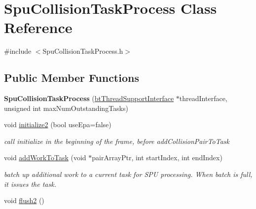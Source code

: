 \hypertarget{class_spu_collision_task_process}{\section{Spu\+Collision\+Task\+Process Class Reference}
\label{class_spu_collision_task_process}
}


{\ttfamily \#include $<$Spu\+Collision\+Task\+Process.\+h$>$}

\subsection*{Public Member Functions}
\begin{DoxyCompactItemize}
\item 
\hypertarget{class_spu_collision_task_process_ae2fd53d16de149643d8f538e183e48eb}{{\bfseries Spu\+Collision\+Task\+Process} (\hyperlink{classbt_thread_support_interface}{bt\+Thread\+Support\+Interface} $\ast$thread\+Interface, unsigned int max\+Num\+Outstanding\+Tasks)}\label{class_spu_collision_task_process_ae2fd53d16de149643d8f538e183e48eb}

\item 
\hypertarget{class_spu_collision_task_process_afcdb413769d35c957ddc5c8ec2985588}{void \hyperlink{class_spu_collision_task_process_afcdb413769d35c957ddc5c8ec2985588}{initialize2} (bool use\+Epa=false)}\label{class_spu_collision_task_process_afcdb413769d35c957ddc5c8ec2985588}

\begin{DoxyCompactList}\small\item\em call initialize in the beginning of the frame, before add\+Collision\+Pair\+To\+Task \end{DoxyCompactList}\item 
\hypertarget{class_spu_collision_task_process_a5a0c4e28e49f0ecfd3aa8255960c77d2}{void \hyperlink{class_spu_collision_task_process_a5a0c4e28e49f0ecfd3aa8255960c77d2}{add\+Work\+To\+Task} (void $\ast$pair\+Array\+Ptr, int start\+Index, int end\+Index)}\label{class_spu_collision_task_process_a5a0c4e28e49f0ecfd3aa8255960c77d2}

\begin{DoxyCompactList}\small\item\em batch up additional work to a current task for S\+P\+U processing. When batch is full, it issues the task. \end{DoxyCompactList}\item 
\hypertarget{class_spu_collision_task_process_afdb2b028ac84b0e90286eb6d4ed10fd3}{void \hyperlink{class_spu_collision_task_process_afdb2b028ac84b0e90286eb6d4ed10fd3}{flush2} ()}\label{class_spu_collision_task_process_afdb2b028ac84b0e90286eb6d4ed10fd3}


\end{DoxyCompactItemize}
